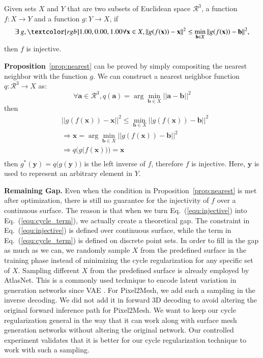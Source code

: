 \begin{m_prop}
	\label{prop:nearest}
	Given sets $X$ and $Y$ that are two subsets of Euclidean space $\mathcal{R}^3$, a function $f:X \rightarrow Y$  and a function $g:Y \rightarrow X$, if
	\begin{equation}
	\exists~g, \mdf{\forall \mathbf{x} \in X}, || g(f(\mathbf{x})) - \mathbf{x} ||^2 \leq \min_{\mathbf{b} \in X}|| g(f(\mathbf{x})) - \mathbf{b} ||^2,
	\end{equation}
	then $f$ is injective. 
\end{m_prop}

\textbf{Proposition}~\ref{prop:nearest} can be proved by simply compositing the nearest neighbor with the function $g$. We can construct a nearest neighbor function $q: \mathcal{R}^3 \rightarrow X $ as:
\begin{equation}
\forall \mathbf{a} \in \mathcal{R}^3, q(\mathbf{a}) = \arg\min_{\mathbf{b} \in X} || \mathbf{a} - \mathbf{b} ||^2
\end{equation}
then 
\begin{equation}
\begin{aligned}
&|| g(f(\mathbf{x})) - \mathbf{x} ||^2 \leq \min_{\mathbf{b} \in X}|| g(f(\mathbf{x})) - \mathbf{b} ||^2\\
&\Rightarrow \mathbf{x} = \arg\min_{\mathbf{b} \in X}|| g(f(\mathbf{x})) - \mathbf{b} ||^2\\
&\Rightarrow q\Big(g\big(f(\mathbf{x})\big)\Big) = \mathbf{x}\\
\end{aligned}
\end{equation}
then $g^*(\mathbf{y}) = q\big(g(\mathbf{y})\big)$ is the left inverse of $f$, therefore $f$ is injective. Here, $\mathbf{y}$ is used to represent an arbitrary element in $Y$.

\noindent\textbf{Remaining Gap.}
Even when the condition in Proposition~\ref{prop:nearest} is met after optimization, there is still no guarantee for the injectivity of $f$ over a continuous surface. The reason is that when we turn Eq.~(\ref{equ:injective}) into Eq.~(\ref{equ:cycle_term}), we actually create a theoretical gap. 
The constraint in Eq.~(\ref{equ:injective}) is defined over continuous surface, while the term in  Eq.~(\ref{equ:cycle_term}) is defined on discrete point sets. In order to fill in the gap as much as we can, we randomly sample $X$ from the predefined surface in the training phase instead of minimizing the cycle regularization for any specific set of $X$. Sampling different $X$ from the predefined surface is already employed by AtlasNet. This is a commonly used technique to encode latent variation in generation networks since VAE \cite{VAE}. For Pixel2Mesh, we add such a sampling in the inverse decoding. We did not add it in forward 3D decoding to avoid altering the original forward inference path for Pixel2Mesh. We want to keep our cycle regularization general in the way that it can work along with surface mesh generation networks without altering the original network. Our controlled experiment validates that it is better for our cycle regularization technique to work with such a sampling.

